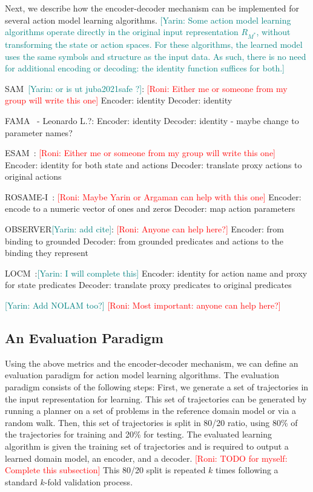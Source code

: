 \documentclass{article}
\theoremstyle{definition}
\theoremstyle{remark}
\newcommand{\realm}{\ensuremath{M^*}\xspace}
\newcommand{\roni}[1]{{\textcolor{red}{[Roni: #1]}}}
\newcommand{\yarin}[1]{{\textcolor{teal}{[Yarin: #1]}}}
\begin{document}
Next, we describe how the encoder-decoder mechanism can be implemented for several action model learning algorithms. \yarin{Some action model learning algorithms operate directly in the original input representation $R_{\realm}$, without transforming the state or action spaces. For these algorithms, the learned model uses the same symbols and structure as the input data. As such, there is no need for additional encoding or decoding: the identity function suffices for both.}

SAM~\citep{stern2017efficient}\yarin{or is ut juba2021safe ?}: \roni{Either me or someone from my group will write this one}
Encoder: identity
Decoder: identity

FAMA~\citep{aineto2019learning} - Leonardo L.?:
Encoder: identity
Decoder: identity - maybe change to parameter names?

ESAM~\citep{juba2021safe}: \roni{Either me or someone from my group will write this one}
Encoder: identity for both state and actions     
Decoder: translate proxy actions to original actions

ROSAME-I~\citep{xi2024neuro}: \roni{Maybe Yarin or Argaman can help with this one}
Encoder: encode to a numeric vector of ones and zeros
Decoder: map action parameters

OBSERVER\yarin{add cite}: \roni{Anyone can help here?}
Encoder: from binding to grounded
Decoder: from grounded predicates and actions to the binding they represent

LOCM~\citep{cresswell2013acquiring}:\yarin{I will complete this}
Encoder: identity for action name and proxy for state predicates
Decoder: translate proxy predicates to original predicates

\yarin{Add NOLAM too?}
\roni{Most important: anyone can help here?}


\subsection{An Evaluation Paradigm}
Using the above metrics and the encoder-decoder mechanism, we can define an evaluation paradigm for action model learning algorithms.
The evaluation paradigm consists of the following steps: 
First, we generate a set of trajectories in the input representation for learning. 
This set of trajectories can be generated by running a planner on a set of problems in the reference domain model or via a random walk.
Then, this set of trajectories is split in 80/20 ratio, using 80\% of the trajectories for training and 20\% for testing. 
The evaluated learning algorithm is given the training set of trajectories and is required to output a learned domain model, an encoder, and a decoder. 
\roni{TODO for myself: Complete this subsection}
This 80/20 split is repeated $k$ times following a standard $k$-fold validation process. 
\end{document}
